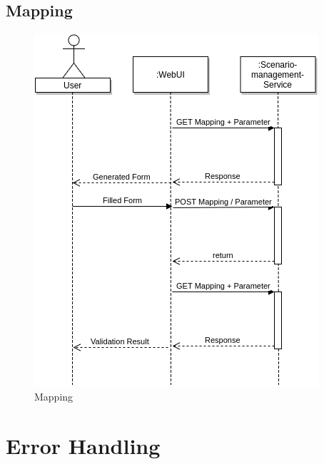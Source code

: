 \subsection{Mapping}
\begin{figure}[H]
	\centering\includegraphics[width=.75\textwidth]{res/Mapping}
	\caption{Mapping}
	\label{fig:mapping}
\end{figure}


\section{Error Handling}
